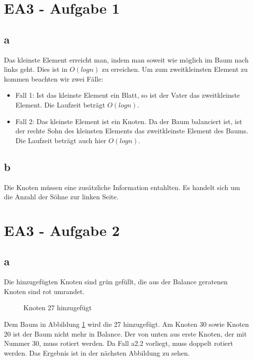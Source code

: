 \documentclass[12pt]{article}
\begin{document}
\section*{EA3 - Aufgabe 1}

\subsection*{a}
Das kleinste Element erreicht man, indem man soweit wie möglich im Baum nach links geht.
Dies ist in $O(log n)$ zu erreichen. Um zum zweitkleinsten Element zu kommen beachten wir zwei Fälle:

\begin{itemize}
\item Fall 1: Ist das kleinste Element ein Blatt, so ist der Vater das zweitkleinste Element. Die 
Laufzeit beträgt $O(log n)$.
\item Fall 2: Das kleinste Element ist ein Knoten. Da der Baum balanciert ist, ist der rechte
Sohn des kleinsten Elements das zweitkleinste Element des Baums. Die Laufzeit beträgt auch hier $O(log n)$.
\end{itemize}


\subsection*{b}
Die Knoten müssen eine zusätzliche Information entahlten. Es handelt sich um die Anzahl
der Söhne zur linken Seite. 

\newpage

\section*{EA3 - Aufgabe 2}

\subsection*{a}
Die hinzugefügten Knoten sind grün gefüllt, die aus der Balance geratenen Knoten sind
rot umrandet.

\begin{figure}[h]
	\centering
	\scalebox{.5}{}
	\caption{Knoten 27 hinzugefügt}
	\label{img:abb1}
\end{figure}

Dem Baum in Abbildung \ref{img:abb1} wird die 27 hinzugefügt. Am Knoten 30 sowie Knoten 20 ist der Baum nicht mehr
in Balance. Der von unten aus erste Knoten, der mit Nummer 30, muss rotiert werden. Da Fall
a2.2 vorliegt, muss doppelt rotiert werden. Das Ergebnis ist in der nächsten Abbildung zu sehen.  
\end{document}
